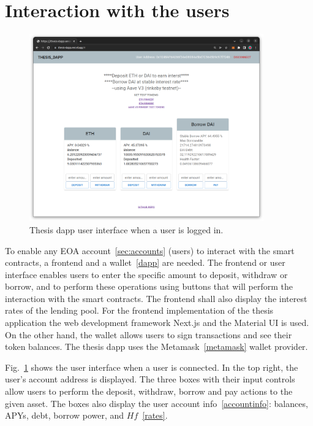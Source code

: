 \documentclass[11pt,a4paper]{report}
\begin{document}
\section{Interaction with the users}
\begin{figure}
	\centering
	\includegraphics[width=0.90\textwidth]{./images/thesis-dapp}
	\caption{Thesis dapp user interface when a user is logged in.}
	\label{fig:tdapp}
\end{figure}
To enable any EOA account~\ref{sec:accounts} (users) to interact with the smart contracts, a frontend and a wallet~\ref{dapp} are needed. The frontend or user interface enables users to enter the specific amount to deposit, withdraw or borrow, and to perform these operations using buttons that will perform the interaction with the smart contracts. The frontend shall also display the interest rates of the lending pool. For the frontend implementation of the thesis application the web development framework Next.js\cite{nextjs} and the Material UI\cite{mui} is used. On the other hand, the wallet allows users to sign transactions and see their token balances. The thesis dapp uses the Metamask~\ref{metamask} wallet provider.

Fig.~\ref{fig:tdapp} shows the user interface when a user is connected. In the top right, the user's account address is displayed. The three boxes with their input controls allow users to perform the deposit, withdraw, borrow and pay actions to the given asset. The boxes also display the user account info~\ref{accountinfo}: balances, APYs, debt, borrow power, and $Hf$~\ref{rates}.
\end{document}
